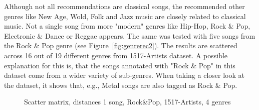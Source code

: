 \noindent Although not all recommendations are classical songs, the recommended other genres like New Age, Wold, Folk and Jazz music are closely related to classical music. Not a single song from more "modern" genres like Hip-Hop, Rock \& Pop, Electronic \& Dance or Reggae appears.
\noindent The same was tested with five songs from the Rock \& Pop genre (see Figure~\ref{fig:genrerec2}). The results are scattered across 16 out of 19 different genres from 1517-Artists dataset. A possible explanation for this is, that the songs annotated with "Rock \& Pop" in this dataset come from a wider variety of sub-genres. When taking a closer look at the dataset, it shows that, e.g., Metal songs are also tagged as Rock \& Pop.\\
\begin{figure}[htbp]
	\centering
	\caption{Scatter matrix, distances 1 song, Rock\&Pop, 1517-Artists, 4 genres}
	\label{fig:corr5}
\end{figure}
\FloatBarrier

